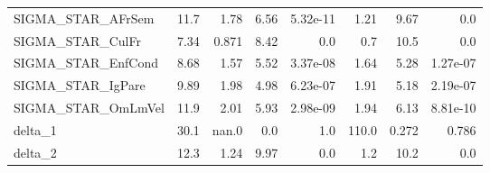 \begin{tabular}{lrrrrrrr}
SIGMA\_STAR\_AFrSem  &   11.7 &     1.78 &    6.56 & 5.32e-11 &          1.21 &         9.67 &           0.0 \\
SIGMA\_STAR\_CulFr   &   7.34 &    0.871 &    8.42 &      0.0 &           0.7 &         10.5 &           0.0 \\
SIGMA\_STAR\_EnfCond &   8.68 &     1.57 &    5.52 & 3.37e-08 &          1.64 &         5.28 &      1.27e-07 \\
SIGMA\_STAR\_IgPare  &   9.89 &     1.98 &    4.98 & 6.23e-07 &          1.91 &         5.18 &      2.19e-07 \\
SIGMA\_STAR\_OmLmVel &   11.9 &     2.01 &    5.93 & 2.98e-09 &          1.94 &         6.13 &      8.81e-10 \\
delta\_1            &   30.1 &    nan.0 &     0.0 &      1.0 &         110.0 &        0.272 &         0.786 \\
delta\_2            &   12.3 &     1.24 &    9.97 &      0.0 &           1.2 &         10.2 &           0.0 \\
\bottomrule
\end{tabular}

